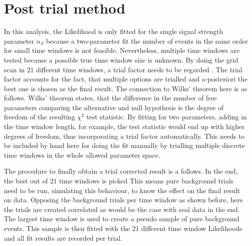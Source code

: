 
\section{Post trial method}
  \label{chp:time_dep_post_trial}
In this analysis, the Likelihood is only fitted for the single signal strength parameter $n_S$ because a two-parameter fit the number of events in the same order for small time windows is not feasible.
Nevertheless, multiple time windows are tested because a possible true time window size is unknown.
By doing the grid scan in $\num{21}$ different time windows, a trial factor needs to be regarded \cite{Gross:2010qma}.
The trial factor accounts for the fact, that multiple options are trialled and a-posteriori the best one is chosen as the final result.
The connection to Wilks' theorem here is as follows.
Wilks' theorem states, that the difference in the number of free parameters comparing the alternative and null hypothesis is the degree of freedom of the resulting $\chi^2$ test statistic.
By fitting for two parameters, adding in the time window length, for example, the test statistic would end up with higher degrees of freedom, thus incorporating a trial factor automatically.
This needs to be included by hand here for doing the fit manually by trialling multiple discrete time windows in the whole allowed parameter space.

The procedure to finally obtain a trial corrected result is a follows.
In the end, the best out of $\num{21}$ time windows is picked
This means pure background trials need to be run, simulating this behaviour, to know the effect on the final result on data.
Opposing the background trials per time window as shown before, here the trials are created correlated as would be the case with real data in the end.
The largest time window is used to create a pseudo sample of pure background events.
This sample is then fitted with the $\num{21}$ different time window Likelihoods and all fit results are recorded per trial.

